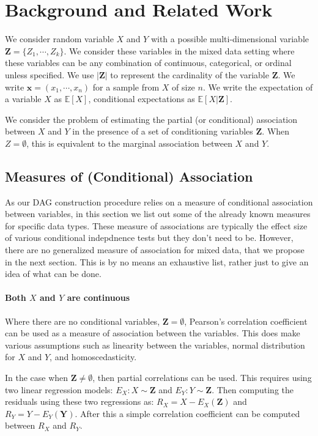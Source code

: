 \documentclass[letterpaper]{article} %
\begin{document}
\section{Background and Related Work}
\label{sec:background}
We consider random variable $ X $ and $ Y $ with a possible multi-dimensional
variable $ \bm{Z} = \{ Z_1, \cdots, Z_k \} $. We consider these variables in
the mixed data setting where these variables can be any combination of
continuous, categorical, or ordinal unless specified. We use $ \rvert \bm{Z}
\rvert $ to represent the cardinality of the variable $ \bm{Z} $. We write $
\bm{x} = (x_1, \cdots, x_n) $ for a sample from $ X $ of size $ n $. We write
the expectation of a variable $ X $ as $ \mathbb{E}[X] $, conditional
expectations as $ \mathbb{E}[X | \bm{Z}] $.

We consider the problem of estimating the partial (or conditional) association
between $ X $ and $ Y $ in the presence of a set of conditioning variables $
\bm{Z} $. When $ Z = \emptyset $, this is equivalent to the marginal
association between $ X $ and $ Y $.


\subsection{Measures of (Conditional) Association}
As our DAG construction procedure relies on a measure of conditional
association between variables, in this section we list out some of the already
known measures for specific data types. These measure of associations are
typically the effect size of various conditional indepdnence tests but they
don't need to be. However, there are no generalized measure of association for
mixed data, that we propose in the next section. This is by no means an
exhaustive list, rather just to give an idea of what can be done.

\paragraph{Both $ X $ and $ Y $ are continuous}
Where there are no conditional variables, $ \bm{Z} = \emptyset $, Pearson's
correlation coefficient can be used as a measure of association between the
variables. This does make various assumptions such as linearity between the
variables, normal distribution for $ X $ and $ Y $, and homoscedasticity.

In the case when $ \bm{Z} \neq \emptyset $, then partial correlations can be
used. This requires using two linear regression models: $ E_X: X \sim \bm{Z} $
and $ E_Y: Y \sim \bm{Z} $. Then computing the residuals using these two
regressions as: $ R_X = X - E_X(\bm{Z}) $ and $ R_Y = Y - E_Y(\bm{Y}) $. After
this a simple correlation coefficient can be computed between $ R_X $ and $ R_Y $.
\end{document}
